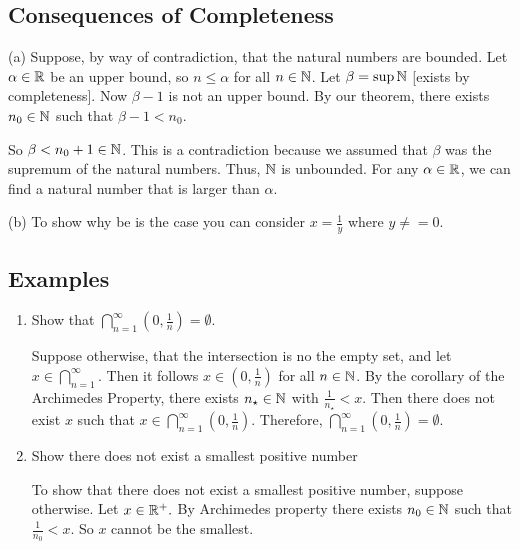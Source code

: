 \documentclass{report}
\begin{document}
\subsection{Consequences of Completeness}

\begin{myproof}
  
  (a) Suppose, by way of contradiction, that the natural numbers are bounded. Let $\alpha \in \RR$ be an upper bound, so $n \leq \alpha$ for all $n \in \NN$. Let $\beta = \sup \NN$ [exists by completeness]. Now $\beta - 1$ is not an upper bound. By our theorem, there exists $n_0 \in \NN$ such that $\beta - 1 < n_0.$ \par
  So $\beta < n_0 +1 \in \NN$. This is a contradiction because we assumed that $\beta$ was the supremum of the natural numbers. Thus, $\NN$ is unbounded. For any $\alpha \in \RR$, we can find a natural number that is larger than $\alpha.$

  (b) To show why be is the case you can consider $x = \frac{1}{y}$ where $y \neq =0.$
\end{myproof}

\subsection{Examples}

\begin{enumerate}
    
\item
Show that $\bigcap^{\infty}_{n=1} (0, \frac{1}{n}) = \emptyset.$

\begin{myproof}
    Suppose otherwise, that the intersection is no the empty set, and let $x \in \bigcap^{\infty}_{n=1}.$ Then it follows $x \in (0, \frac{1}{n})$ for all $n \in \NN$. By the corollary of the Archimedes Property, there exists  $n_\star \in \NN$ with $\frac{1}{n_\star} < x.$ Then there does not exist $x$ such that $x \in \bigcap^{\infty}_{n=1} (0,\frac{1}{n})$. Therefore, $\bigcap^{\infty}_{n=1} (0, \frac{1}{n}) = \emptyset.$
\end{myproof}

\item Show there does not exist a smallest positive number
  \begin{myproof}
      To show that there does not exist a smallest positive number, suppose otherwise. Let $x \in \RR^+.$ By Archimedes property there exists $n_0 \in \NN$ such that $\frac{1}{n_0} < x.$ So $x$ cannot be the smallest.
  \end{myproof}
\end{enumerate}
\pagebreak
\end{document}
